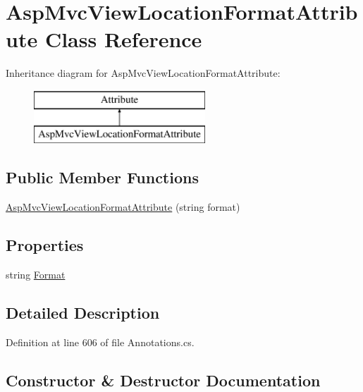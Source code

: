 \hypertarget{class_asp_mvc_view_location_format_attribute}{}\section{Asp\+Mvc\+View\+Location\+Format\+Attribute Class Reference}
\label{class_asp_mvc_view_location_format_attribute}
Inheritance diagram for Asp\+Mvc\+View\+Location\+Format\+Attribute\+:\begin{figure}[H]
\begin{center}
\leavevmode
\includegraphics[height=2.000000cm]{class_asp_mvc_view_location_format_attribute}
\end{center}
\end{figure}
\subsection*{Public Member Functions}
\begin{DoxyCompactItemize}
\item 
\hyperlink{class_asp_mvc_view_location_format_attribute_aecb3c29d8605da500d4af960ba99f207}{Asp\+Mvc\+View\+Location\+Format\+Attribute} (string format)
\end{DoxyCompactItemize}
\subsection*{Properties}
\begin{DoxyCompactItemize}
\item 
string \hyperlink{class_asp_mvc_view_location_format_attribute_a3489b3971df02310fd8abb286247c4ae}{Format}
\end{DoxyCompactItemize}


\subsection{Detailed Description}


Definition at line 606 of file Annotations.\+cs.



\subsection{Constructor \& Destructor Documentation}
\hypertarget{class_asp_mvc_view_location_format_attribute_aecb3c29d8605da500d4af960ba99f207}{}
